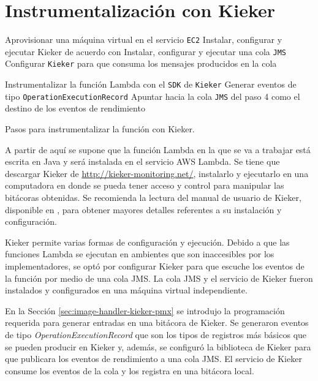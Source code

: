 \section{Instrumentalización con Kieker}

\begin{singlespace}
\begin{algorithm}[H]
\SetAlgoLined
Aprovisionar una máquina virtual en el servicio \texttt{EC2}\;
Instalar, configurar y ejecutar Kieker de acuerdo con \cite{kieker-user-guide}\;
Instalar, configurar y ejecutar una cola \texttt{JMS}\;
Configurar \texttt{Kieker} para que consuma los mensajes producidos en la cola\;

Instrumentalizar la función Lambda con el \texttt{SDK} de \texttt{Kieker}\;
Generar eventos de tipo \texttt{OperationExecutionRecord}\;
Apuntar hacia la cola \texttt{JMS} del paso 4 como el destino de los eventos de rendimiento\;

 \caption{Pasos para instrumentalizar la función con Kieker.}
\end{algorithm}
\end{singlespace}

A partir de aquí se supone que la función Lambda en la que se va a trabajar está escrita en Java y será instalada en el servicio AWS Lambda. Se tiene que descargar Kieker de \url{http://kieker-monitoring.net/}, instalarlo y ejecutarlo en una computadora en donde se pueda tener acceso y control para manipular las bitácoras obtenidas. Se recomienda la lectura del manual de usuario de Kieker, disponible en \cite{kieker-user-guide}, para obtener mayores detalles referentes a su instalación y configuración.

Kieker permite varias formas de configuración y ejecución. Debido a que las funciones Lambda se ejecutan en ambientes que son inaccesibles por los implementadores, se optó por configurar Kieker para que escuche los eventos de la función por medio de una cola JMS. La cola JMS y el servicio de Kieker fueron instalados y configurados en una máquina virtual independiente.

En la Sección \ref{sec:image-handler-kieker-pmx} se introdujo la programación requerida para generar entradas en una bitácora de Kieker. Se generaron eventos de tipo \emph{OperationExecutionRecord} que son los tipos de registros más básicos que se pueden producir en Kieker y, además, se configuró la biblioteca de Kieker para que publicara los eventos de rendimiento a una cola JMS. El servicio de Kieker consume los eventos de la cola y los registra en una bitácora local.

